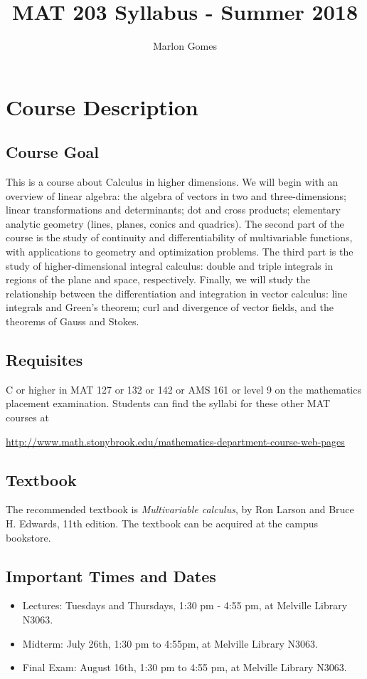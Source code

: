 \documentclass[11pt]{amsart}
\title[MAT 203 Syllabus - Summer 2018]{MAT 203 Syllabus - Summer 2018}
\author[M. Gomes]{Marlon Gomes}
\numberwithin{equation}{section}
\begin{document}
\maketitle

\section{Course Description}
\subsection{Course Goal}
This is a course about Calculus in higher dimensions. We will begin with an overview of linear algebra: the algebra of vectors in two and three-dimensions; linear transformations and determinants; dot and cross products; elementary analytic geometry (lines, planes, conics and quadrics).
The second part of the course is the study of continuity and differentiability of multivariable functions, with applications to geometry and optimization problems. 
The third part is the study of higher-dimensional integral calculus: double and triple integrals in regions of the plane and space, respectively.
Finally, we will study the relationship between the differentiation and integration in vector calculus: line integrals and Green's theorem; curl and divergence of vector fields, and the theorems of Gauss and Stokes. 

\subsection{Requisites}
C or higher in MAT 127 or 132 or 142 or AMS 161 or level 9 on the mathematics placement examination. Students can find the syllabi for these other MAT courses at 
\begin{center}
\url{http://www.math.stonybrook.edu/mathematics-department-course-web-pages}
\end{center}

\subsection{Textbook}
The recommended textbook is \textit{Multivariable calculus}, by Ron Larson and Bruce H. Edwards, 11th edition. The textbook can be acquired at the campus bookstore. 

\subsection{Important Times and Dates}
\begin{itemize}
\item Lectures: Tuesdays and Thursdays, 1:30 pm - 4:55 pm, at Melville Library N3063.
\item Midterm: July 26th, 1:30 pm to 4:55pm, at Melville Library N3063. 
\item Final Exam: August 16th, 1:30 pm to 4:55 pm, at Melville Library N3063.
\end{itemize}
\end{document}
